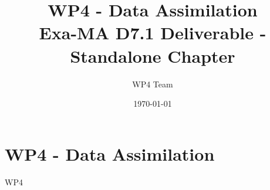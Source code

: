 \documentclass[11pt]{report}
\begin{document}
\title{WP4 - Data Assimilation\\
\large Exa-MA D7.1 Deliverable - Standalone Chapter}
\author{WP4 Team}
\date{\today}
\maketitle

\tableofcontents
\clearpage

\chapter{WP4 - Data Assimilation}
\label{chap:wp4}

{WP4}

\clearpage


\end{document}
